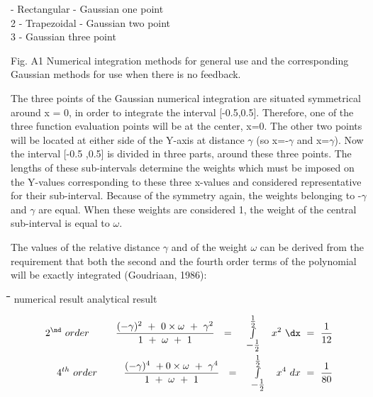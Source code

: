 \documentclass[11pt]{article}
\begin{document}
  - Rectangular - Gaussian one point\\
      2 - Trapezoidal - Gaussian two point\\
      3 - Gaussian three point

\bigskip
\bigskip
\bigskip
\bigskip
\bigskip
\bigskip
Fig. A1 Numerical integration methods for general use and the corresponding Gaussian
methods for use when there is no feedback.

\bigskip
The three points of the Gaussian numerical integration are situated symmetrical around x =
0, in order to integrate the interval [-0.5,0.5]. Therefore, one of the three function
evaluation points will be at the center, x=0. The other two points will be located at either
side of the Y-axis at distance $\gamma$ (so x=-$\gamma$ and x=$\gamma$). Now the interval [-0.5 ,0.5] is divided
in three parts, around these three points. The lengths of these sub-intervals determine the
weights which must be imposed on the Y-values corresponding to these three x-values and
considered representative for their sub-interval. Because of the symmetry again, the weights
belonging to -$\gamma$ and $\gamma$ are equal. When these weights are considered 1, the weight of the
central sub-interval is equal to $\omega$.

\bigskip
\bigskip
\bigskip
\bigskip
\bigskip
\bigskip
The values of the relative distance $\gamma$ and of the weight $\omega$ can be derived from the
requirement that both the second and the fourth order terms of the polynomial will be
exactly integrated (Goudriaan, 1986):
\nwln
\begin{tabbing}
\hspace{1.27cm}\=\hspace{1.27cm}\=\hspace{1.27cm}\=\hspace{1.27cm}\=%
\hspace{1.27cm}\=\hspace{1.27cm}\=\hspace{1.27cm}\=\hspace{1.27cm}\=%
\hspace{1.27cm}\=\hspace{1.27cm}\=\kill
\>\> \> \>  numerical result\> \> \> \>    analytical result
\end{tabbing}

\begin{eqnarray*}
2 ^{\nd} ~ order~~~~~~~~{\frac{(- \gamma ) ^{2} ~+~0 \times \omega  ~+~\gamma ^{2} }{1~+~\omega ~+~1}} ~~=~~\begin{array}{c}{{\frac{1}{2}}}  \\
\int  \\
{-{\frac{1}{2}}} \end{array} ~~x ^{2} ~\dx ~=~{{\frac{1}{12}} }  \nonumber  \\
4 ^{th} ~ order~~~~~~~~{\frac{(-\gamma )^{4} ~+0 \times \omega  ~+~\gamma ^{4} }{1~ +~\omega ~+~1}} ~~=~~\begin{array}{c}{{\frac{1}{2}}}  \\
\int  \\
{-{\frac{1}{2}}} \end{array} ~~x ^{4} ~dx~=~{{\frac{1}{80}} }
\end{eqnarray*}
\end{document}
